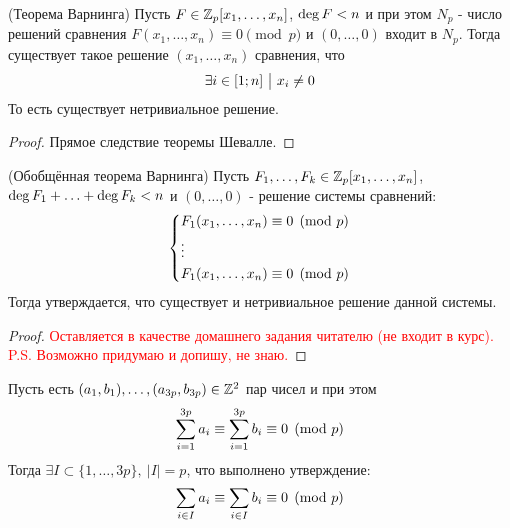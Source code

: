 \begin{theorem} (Теорема Варнинга)
	Пусть $F \in \mathbb{Z}_p[x_1, \ldots, x_n]$, $\operatorname{deg} F < n$ и при этом $N_p$ - число решений сравнения $F(x_1, \ldots, x_n) \equiv 0 \pmod p$ и $(0, \ldots, 0)$ входит в $N_p$. Тогда существует такое решение $(x_1, \ldots, x_n)$ сравнения, что
	\[
		\exists i \in [1; n] \ \big|\  x_i \neq 0
	\]
	То есть существует нетривиальное решение.
\end{theorem}

\begin{proof}
	Прямое следствие теоремы Шевалле.
\end{proof}

\begin{theorem} (Обобщённая теорема Варнинга)
	Пусть $F_1, \ldots, F_k \in \mathbb{Z}_p[x_1, \ldots, x_n]$, $\operatorname{deg} F_1 + \ldots + \operatorname{deg} F_k < n$ и $(0, \ldots, 0)$ - решение системы сравнений:
	\[
	\left\{\begin{aligned}
		&{F_1(x_1, \ldots, x_n) \equiv 0 \pmod p}
		\\
		&\vdots
		\\
		&{F_1(x_1, \ldots, x_n) \equiv 0 \pmod p}
	\end{aligned}\right.
	\]
	Тогда утверждается, что существует и нетривиальное решение данной системы.
\end{theorem}

\begin{proof}
	\textcolor{red}{Оставляется в качестве домашнего задания читателю (не входит в курс). P.S. Возможно придумаю и допишу, не знаю.}
\end{proof}

\begin{lemma}
	Пусть есть $(a_1, b_1), \ldots, (a_{3p}, b_{3p}) \in \mathbb{Z}^2$ пар чисел и при этом
	\[
		\sum\limits_{i = 1}^{3p} a_i \equiv \sum\limits_{i = 1}^{3p} b_i \equiv 0 \pmod p
	\]
	Тогда $\exists I \subset \{1, \ldots, 3p\},\ |I| = p$, что выполнено утверждение:
	\[
		\sum\limits_{i \in I} a_i \equiv \sum\limits_{i \in I} b_i \equiv 0 \pmod p
	\]
\end{lemma}

